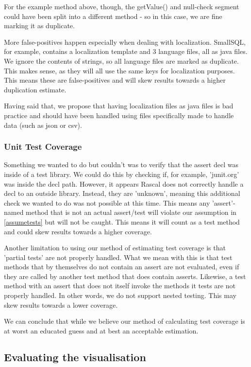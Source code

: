 \documentclass{article}
\begin{document}
For the example method above, though, the getValue() and null-check segment could have been split into a different method - so in this case, we are fine marking it as duplicate.

More false-positives happen especially when dealing with localization. SmallSQL, for example, contains a localization template and 3 language files, all as java files. We ignore the contents of strings, so all language files are marked as duplicate. This makes sense, as they will all use the same keys for localization purposes. This means these are false-positives and will skew results towards a higher duplication estimate.

Having said that, we propose that having localization files as java files is bad practice and should have been handled using files specifically made to handle data (such as json or csv).

\subsubsection{Unit Test Coverage}
Something we wanted to do but couldn't was to verify that the assert decl was inside of a test library. We could do this by checking if, for example, 'junit.org' was inside the decl path. However, it appears Rascal does not correctly handle a decl to an outside library. Instead, they are 'unknown', meaning this additional check we wanted to do was not possible at this time. This means any 'assert'-named method that is not an actual assert/test will violate our assumption in \ref{assumetests} but will not be caught. This means it will count as a test method and could skew results towards a higher coverage.

Another limitation to using our method of estimating test coverage is that 'partial tests' are not properly handled. What we mean with this is that test methods that by themselves do not contain an assert are not evaluated, even if they are called by another test method that does contain asserts. Likewise, a test method with an assert that does not itself invoke the methods it tests are not properly handled.
In other words, we do not support nested testing. This may skew results towards a lower coverage.

We can conclude that while we believe our method of calculating test coverage is at worst an educated guess and at best an acceptable estimation.

\subsection{Evaluating the visualisation}
\end{document}
